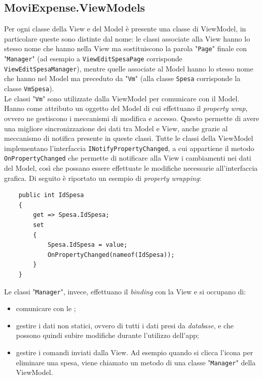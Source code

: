 \subsection{MoviExpense.ViewModels}

Per ogni classe della View e del Model è presente una classe di ViewModel, in particolare queste sono distinte dal nome: le classi associate alla View hanno lo stesso nome che hanno nella View ma sostituiscono la parola "\texttt{Page}" finale con "\texttt{Manager}" (ad esempio a \texttt{ViewEditSpesaPage} corrisponde \texttt{ViewEditSpesaManager}), mentre quelle associate al Model hanno lo stesso nome che hanno nel Model ma preceduto da "\texttt{Vm}" (alla classe \texttt{Spesa} corrisponde la classe \texttt{VmSpesa}).\\
Le classi "\texttt{Vm}" sono utilizzate dalla ViewModel per comunicare con il Model. Hanno come attributo un oggetto del Model di cui effettuano il \textit{property wrap}, ovvero ne gestiscono i meccanismi di modifica e accesso. Questo permette di avere una migliore sincronizzazione dei dati tra Model e View, anche grazie al meccanismo di notifica presente in queste classi. Tutte le classi della ViewModel implementano l'interfaccia \texttt{INotifyPropertyChanged}, a cui appartiene il metodo \texttt{OnPropertyChanged} che permette di notificare alla View i cambiamenti nei dati del Model, così che possano essere effettuate le modifiche necessarie all'interfaccia grafica. Di seguito è riportato un esempio di \textit{property wrapping}:
\begin{verbatim}
    public int IdSpesa
    {
        get => Spesa.IdSpesa;
        set
        {
            Spesa.IdSpesa = value;
            OnPropertyChanged(nameof(IdSpesa));
        }
    }
\end{verbatim}

\noindent Le classi "\texttt{Manager}", invece, effettuano il \textit{binding} con la View e si occupano di:
\begin{itemize}
    \item comunicare con le ;
    \item gestire i dati non statici, ovvero di tutti i dati presi da \textit{database}, e che possono quindi subire modifiche durante l'utilizzo dell'app;
    \item gestire i comandi inviati dalla View. Ad esempio quando si clicca l'icona per eliminare una spesa, viene chiamato un metodo di una classe "\texttt{Manager}" della ViewModel.
\end{itemize}

